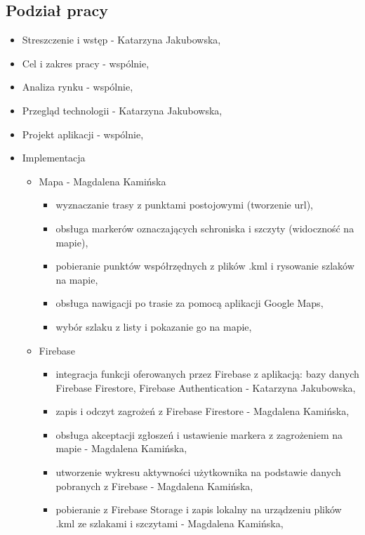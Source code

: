     \subsection{Podział pracy}
    \begin{itemize}
        \item Streszczenie i wstęp - Katarzyna Jakubowska,
        \item Cel i zakres pracy - wspólnie,
        \item Analiza rynku - wspólnie,
        \item Przegląd technologii - Katarzyna Jakubowska,
        \item Projekt aplikacji - wspólnie,
        \item Implementacja
        \begin{itemize}[label=$\circ$]
            \item Mapa - Magdalena Kamińska
            \begin{itemize}
                \item wyznaczanie trasy z punktami postojowymi (tworzenie url),
                \item obsługa markerów oznaczających schroniska i szczyty (widoczność na mapie),
                \item pobieranie punktów współrzędnych z plików .kml i rysowanie szlaków na mapie,
                \item obsługa nawigacji po trasie za pomocą aplikacji Google Maps,
                \item wybór szlaku z listy i pokazanie go na mapie,
            \end{itemize}
            \item Firebase
            \begin{itemize}
                \item integracja funkcji oferowanych przez Firebase z aplikacją: bazy danych Firebase Firestore, Firebase Authentication - Katarzyna Jakubowska,
                \item zapis i odczyt zagrożeń z Firebase Firestore - Magdalena Kamińska,
                \item obsługa akceptacji zgłoszeń i ustawienie markera z zagrożeniem na mapie - Magdalena Kamińska,
                \item utworzenie wykresu aktywności użytkownika na podstawie danych pobranych z Firebase - Magdalena Kamińska,
                \item pobieranie z Firebase Storage i zapis lokalny na urządzeniu plików .kml ze szlakami i szczytami - Magdalena Kamińska,

\end{itemize}
\end{itemize}
\end{itemize}
